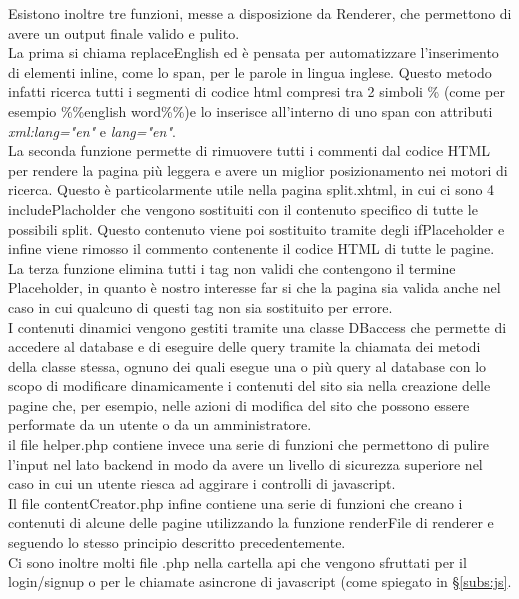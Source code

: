Esistono inoltre tre funzioni, messe a disposizione da Renderer, che permettono di avere un output finale valido e pulito.\\ La prima si chiama replaceEnglish ed è pensata per automatizzare l'inserimento di elementi inline, come lo span, per le parole in lingua
inglese. Questo metodo infatti ricerca tutti i segmenti di codice html compresi tra 2 simboli \% (come per esempio \%\%english word\%\%)e lo inserisce all'interno di uno span con attributi \textit{xml:lang="en"} e \textit{lang="en"}.\\ La seconda funzione permette
di rimuovere tutti i commenti dal codice HTML per rendere la pagina più leggera e avere un miglior posizionamento nei motori di ricerca. Questo è particolarmente utile nella pagina split.xhtml, in cui ci sono 4 includePlacholder che vengono sostituiti con il 
contenuto specifico di tutte le possibili split. Questo contenuto viene poi sostituito tramite degli ifPlaceholder e infine viene rimosso il commento contenente il codice HTML di tutte le pagine.\\ La terza funzione elimina tutti i tag non validi che contengono 
il termine Placeholder, in quanto è nostro interesse far si che la pagina sia valida anche nel caso in cui qualcuno di questi tag non sia sostituito per errore.\\

I contenuti dinamici vengono gestiti tramite una classe DBaccess che permette di accedere al database e di eseguire delle query tramite la chiamata dei metodi della classe stessa, ognuno dei quali esegue una o più query al database con lo scopo di modificare 
dinamicamente i contenuti del sito sia nella creazione delle pagine che, per esempio, nelle azioni di modifica del sito che possono essere performate da un utente o da un amministratore.\\
il file helper.php contiene invece una serie di funzioni che permettono di pulire l'input nel lato backend in modo da avere un livello di sicurezza superiore nel caso in cui un utente riesca ad aggirare i controlli di javascript.\\
Il file contentCreator.php infine contiene una serie di funzioni che creano i contenuti di alcune delle pagine utilizzando la funzione renderFile di renderer e seguendo lo stesso principio descritto precedentemente.\\

Ci sono inoltre molti file .php nella cartella api che vengono sfruttati per il login/signup o per le chiamate asincrone di javascript (come spiegato in \S\ref{subs:js}.



